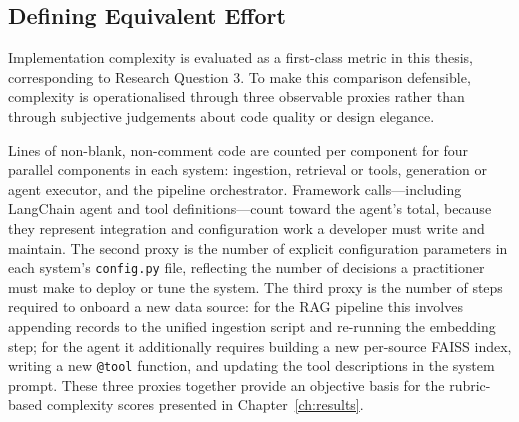 \subsection{Defining Equivalent Effort}

Implementation complexity is evaluated as a first-class metric in this thesis, corresponding to Research Question 3. To make this comparison defensible, complexity is operationalised through three observable proxies rather than through subjective judgements about code quality or design elegance.

Lines of non-blank, non-comment code are counted per component for four parallel components in each system: ingestion, retrieval or tools, generation or agent executor, and the pipeline orchestrator. Framework calls—including LangChain agent and tool definitions—count toward the agent's total, because they represent integration and configuration work a developer must write and maintain. The second proxy is the number of explicit configuration parameters in each system's \texttt{config.py} file, reflecting the number of decisions a practitioner must make to deploy or tune the system. The third proxy is the number of steps required to onboard a new data source: for the RAG pipeline this involves appending records to the unified ingestion script and re-running the embedding step; for the agent it additionally requires building a new per-source FAISS index, writing a new \texttt{@tool} function, and updating the tool descriptions in the system prompt. These three proxies together provide an objective basis for the rubric-based complexity scores presented in Chapter~\ref{ch:results}.
